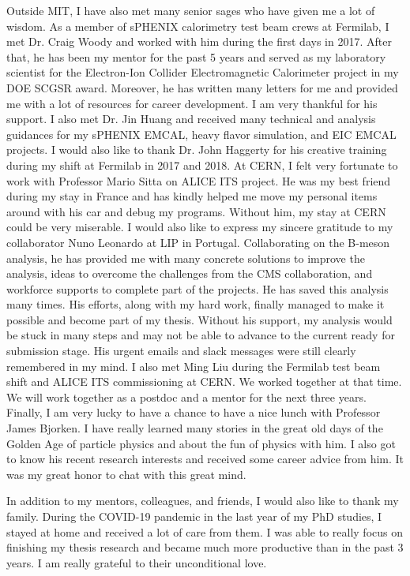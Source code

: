 Outside MIT, I have also met many senior sages who have given me a lot of wisdom. As a member of sPHENIX calorimetry test beam crews at Fermilab, I met Dr. Craig Woody and worked with him during the first days in 2017. After that, he has been my mentor for the past 5 years and served as my laboratory scientist for the Electron-Ion Collider Electromagnetic Calorimeter project in my DOE SCGSR award. Moreover, he has written many letters for me and provided me with a lot of resources for career development. I am very thankful for his support. I also met Dr. Jin Huang and received many technical and analysis guidances for my sPHENIX EMCAL, heavy flavor simulation, and EIC EMCAL projects. I would also like to thank Dr. John Haggerty for his creative training during my shift at Fermilab in 2017 and 2018. At CERN, I felt very fortunate to work with Professor Mario Sitta on ALICE ITS project. He was my best friend during my stay in France and has kindly helped me move my personal items around with his car and debug my programs. Without him, my stay at CERN could be very miserable. I would also like to express my sincere gratitude to my collaborator Nuno Leonardo at LIP in Portugal. Collaborating on the B-meson analysis, he has provided me with many concrete solutions to improve the analysis, ideas to overcome the challenges from the CMS collaboration, and workforce supports to complete part of the projects. He has saved this analysis many times. His efforts, along with my hard work, finally managed to make it possible and become part of my thesis. Without his support, my analysis would be stuck in many steps and may not be able to advance to the current ready for submission stage. His urgent emails and slack messages were still clearly remembered in my mind. I also met Ming Liu during the Fermilab test beam shift and ALICE ITS commissioning at CERN. We worked together at that time. We will work together as a postdoc and a mentor for the next three years. Finally, I am very lucky to have a chance to have a nice lunch with Professor James Bjorken. I have really learned many stories in the great old days of the Golden Age of particle physics and about the fun of physics with him. I also got to know his recent research interests and received some career advice from him. It was my great honor to chat with this great mind.

In addition to my mentors, colleagues, and friends, I would also like to thank my family. During the COVID-19 pandemic in the last year of my PhD studies, I stayed at home and received a lot of care from them. I was able to really focus on finishing my thesis research and became much more productive than in the past 3 years. I am really grateful to their unconditional love. 

